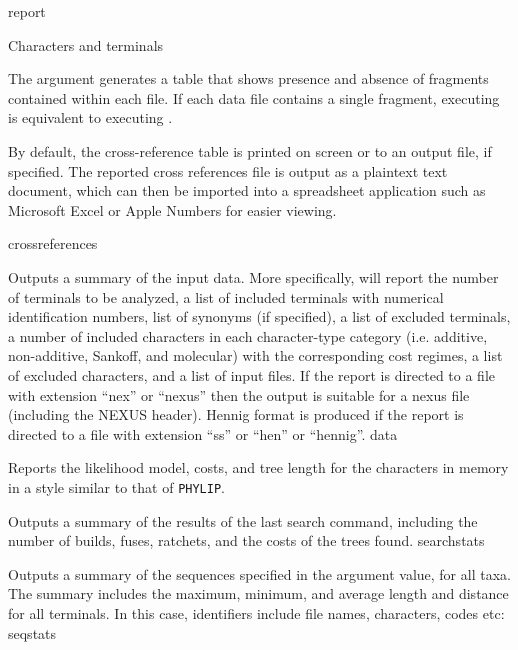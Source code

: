 \begin{command}{report}{}
\begin{arguments}
\begin{argumentgroup}{Characters and terminals}
{                  \setlength{\parindent}{0.5cm}                                
                \indent 
                The argument  generates
                a table that shows presence and absence of fragments contained
                within each file. If each data file contains a
                single fragment,  executing 
                is equivalent to executing .
                
                By default, the cross-reference table is printed on screen or to an
                output file, if specified. The reported cross references file is output 
                as a plaintext text document, which can then be imported into a 
                spreadsheet application such as Microsoft Excel or Apple Numbers 
                for easier viewing.}
                {crossreferences}

                {Outputs a summary of the input data.
                More specifically, \poy will report the number of
                terminals to be analyzed, a list of included terminals with
                numerical identification numbers, list
                of synonyms (if specified), a list of excluded terminals, a
                number of included characters in each character-type category
                (i.e. additive, non-additive, Sankoff, and molecular) with the corresponding
                cost regimes, a list of excluded
                characters, and a list of input files. If the report is directed
                to a file with extension ``nex'' or ``nexus'' then
                the output is suitable for a nexus file (including the NEXUS
                header). Hennig format is produced if the report is directed
                to a file with extension ``ss'' or ``hen'' or ``hennig''.}
                {data}

                {Reports the likelihood model, costs, and tree length for the
                characters in memory in a style similar  to that of \texttt{PHYLIP}.}
                {}

                {Outputs a summary of the results of the last search command,
                including the number of builds, fuses, ratchets, and the costs of
                the trees found.}
                {searchstats}

                {Outputs a summary of the sequences specified in the argument
                value, for all taxa. The summary includes the maximum, minimum,
                and average length and distance for all terminals.  In this case, identifiers
                include file names, characters, codes etc:}
                {seqstats}


\end{argumentgroup}
\end{arguments}
\end{command}
